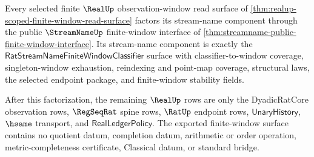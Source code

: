 \begin{theorem}
\label{thm:realup-finite-window-export-through-streamname-interface}
Every selected finite $\RealUp$ observation-window read surface of
\autoref{thm:realup-scoped-finite-window-read-surface} factors its
stream-name component through the public $\StreamNameUp$ finite-window interface
of \autoref{thm:streamname-public-finite-window-interface}. Its stream-name
component is exactly the $\mathsf{RatStreamNameFiniteWindowClassifier}$ surface
with classifier-to-window coverage, singleton-window exhaustion, reindexing and
point-map coverage, structural laws, the selected endpoint package, and
finite-window stability fields.

After this factorization, the remaining $\RealUp$ rows are only the
DyadicRatCore observation rows, $\RegSeqRat$ spine rows, $\RatUp$ endpoint rows,
$\mathsf{UnaryHistory}$, $\hsame$ transport, and
$\mathsf{RealLedgerPolicy}$. The exported finite-window surface contains no
quotient datum, completion datum, arithmetic or order operation,
metric-completeness certificate, Classical datum, or standard bridge.
\end{theorem}
